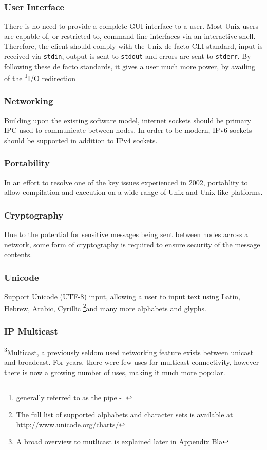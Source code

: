 
\subsubsection{User Interface}

There is no need to provide a complete GUI interface to a user. Most
Unix users are capable of, or restricted to, command line interfaces via
an interactive shell. Therefore, the client should comply with the 
Unix de facto CLI standard, input is received via \verb!stdin!, output
is sent to \verb!stdout! and errors are sent to \verb!stderr!. By
following these de facto standards, it gives a user much more power, by
availing of the 
\footnote{generally referred to as the pipe - $\mid$}{I/O redirection}

\subsubsection{Networking}

Building upon the existing software model, internet sockets should be 
primary IPC used to communicate between nodes. In order to be modern,
IPv6 sockets should be supported in addition to IPv4 sockets.

\subsubsection{Portability}

In an effort to resolve one of the key issues experienced in 2002, 
portablity to allow compilation and execution on a wide range of Unix
and Unix like platforms.

\subsubsection{Cryptography}

Due to the potential for sensitive messages being sent between nodes
across a network, some form of cryptography is required to ensure 
security of the message contents.

\subsubsection{Unicode}

Support Unicode (UTF-8) input, allowing a user to input text using 
Latin, Hebrew, Arabic, Cyrillic
\footnote{The full list of supported alphabets and character sets is available at http://www.unicode.org/charts/}{and many more}
alphabets and glyphs. 

\subsubsection{IP Multicast}

\footnote{A broad overview to mutlicast is explained later in Appendix Bla}{Multicast}, 
a previously seldom used networking feature exists between unicast and 
broadcast. For years, there were few uses for multicast connectivity, 
however there is now a growing number of uses, making it much more 
popular. 

